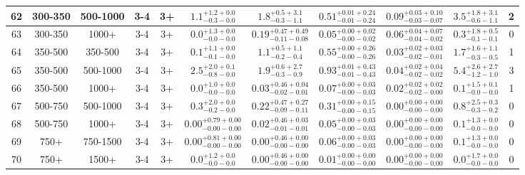 \documentclass[11pt, oneside]{article}
\begin{document}
\begin{table}
{\begin{tabular}{ |c|c|c|c|c||c|c|c|c||c|c| }
62 & 300-350 & 500-1000 & 3-4 & 3+ & $1.1^{+1.2+0.0}_{-0.3-0.0}$ & $1.8^{+0.5+3.1}_{-0.3-1.1}$ & $0.51^{+0.01+0.24}_{-0.01-0.24}$ & $0.09^{+0.03+0.10}_{-0.03-0.07}$ & $3.5^{+1.8+3.1}_{-0.6-1.1}$ & 2 \\ \hline
63 & 300-350 & 1000+ & 3-4 & 3+ & $0.0^{+1.3+0.0}_{-0.0-0.0}$ & $0.19^{+0.47+0.49}_{-0.11-0.08}$ & $0.05^{+0.00+0.02}_{-0.00-0.02}$ & $0.06^{+0.04+0.07}_{-0.04-0.02}$ & $0.3^{+1.8+0.5}_{-0.1-0.1}$ & 0 \\ \hline
64 & 350-500 & 350-500 & 3-4 & 3+ & $0.1^{+1.1+0.0}_{-0.1-0.0}$ & $1.1^{+0.5+1.1}_{-0.2-0.4}$ & $0.55^{+0.00+0.26}_{-0.00-0.26}$ & $0.03^{+0.02+0.03}_{-0.02-0.01}$ & $1.7^{+1.6+1.1}_{-0.3-0.5}$ & 1 \\ \hline
65 & 350-500 & 500-1000 & 3-4 & 3+ & $2.5^{+2.0+0.1}_{-0.8-0.0}$ & $1.9^{+0.6+2.7}_{-0.3-0.9}$ & $0.93^{+0.01+0.43}_{-0.01-0.43}$ & $0.04^{+0.02+0.04}_{-0.02-0.02}$ & $5.4^{+2.6+2.7}_{-1.2-1.0}$ & 3 \\ \hline
66 & 350-500 & 1000+ & 3-4 & 3+ & $0.0^{+1.0+0.0}_{-0.0-0.0}$ & $0.03^{+0.46+0.04}_{-0.02-0.01}$ & $0.07^{+0.00+0.03}_{-0.00-0.03}$ & $0.02^{+0.02+0.02}_{-0.02-0.00}$ & $0.1^{+1.5+0.1}_{-0.0-0.0}$ & 1 \\ \hline
67 & 500-750 & 500-1000 & 3-4 & 3+ & $0.3^{+2.0+0.0}_{-0.2-0.0}$ & $0.22^{+0.47+0.27}_{-0.09-0.11}$ & $0.31^{+0.00+0.15}_{-0.00-0.15}$ & $0.00^{+0.00+0.00}_{-0.00-0.00}$ & $0.8^{+2.5+0.3}_{-0.3-0.2}$ & 0 \\ \hline
68 & 500-750 & 1000+ & 3-4 & 3+ & $0.00^{+0.79+0.00}_{-0.00-0.00}$ & $0.02^{+0.46+0.03}_{-0.01-0.01}$ & $0.05^{+0.00+0.03}_{-0.00-0.03}$ & $0.00^{+0.00+0.00}_{-0.00-0.00}$ & $0.1^{+1.3+0.0}_{-0.0-0.0}$ & 0 \\ \hline
69 & 750+ & 750-1500 & 3-4 & 3+ & $0.00^{+0.81+0.00}_{-0.00-0.00}$ & $0.00^{+0.46+0.00}_{-0.00-0.00}$ & $0.06^{+0.00+0.03}_{-0.00-0.03}$ & $0.00^{+0.00+0.00}_{-0.00-0.00}$ & $0.1^{+1.3+0.0}_{-0.0-0.0}$ & 0 \\ \hline
70 & 750+ & 1500+ & 3-4 & 3+ & $0.0^{+1.2+0.0}_{-0.0-0.0}$ & $0.00^{+0.46+0.00}_{-0.00-0.00}$ & $0.01^{+0.00+0.00}_{-0.00-0.00}$ & $0.00^{+0.00+0.00}_{-0.00-0.00}$ & $0.0^{+1.7+0.0}_{-0.0-0.0}$ & 0 \\ \hline
\end{tabular}}
\end{table}
\end{document}
